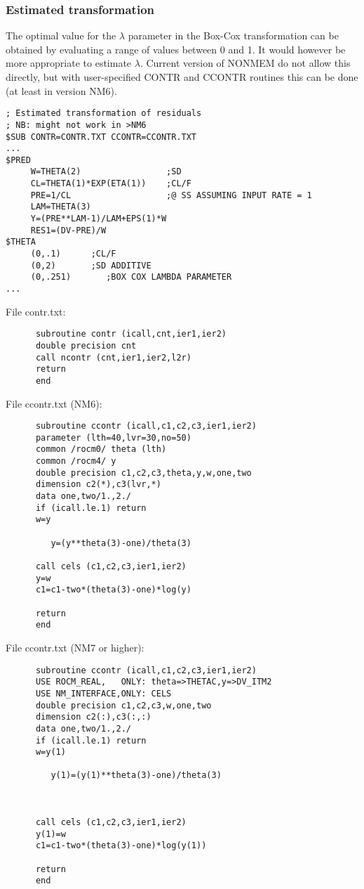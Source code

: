 \documentclass[a4paper,11pt]{article}
\begin{document}
\subsubsection*{Estimated transformation}
The optimal value for the $\lambda$ parameter in the Box-Cox
transformation can be obtained by evaluating a range of values between
0 and 1. It would however be more appropriate to estimate
$\lambda$. Current version of NONMEM do not allow this directly, but
with user-specified CONTR and CCONTR routines this can be done (at
least in version NM6).

\begin{lstlisting}
; Estimated transformation of residuals
; NB: might not work in >NM6
$SUB CONTR=CONTR.TXT CCONTR=CCONTR.TXT
...
$PRED
     W=THETA(2)                 ;SD
     CL=THETA(1)*EXP(ETA(1))    ;CL/F
     PRE=1/CL                   ;@ SS ASSUMING INPUT RATE = 1
     LAM=THETA(3)
     Y=(PRE**LAM-1)/LAM+EPS(1)*W
     RES1=(DV-PRE)/W
$THETA
     (0,.1)      ;CL/F
     (0,2)       ;SD ADDITIVE
     (0,.251)       ;BOX COX LAMBDA PARAMETER
...
\end{lstlisting}

File contr.txt:

\begin{lstlisting}
      subroutine contr (icall,cnt,ier1,ier2)
      double precision cnt
      call ncontr (cnt,ier1,ier2,l2r)
      return
      end
\end{lstlisting}

File ccontr.txt (NM6):

\begin{lstlisting}
      subroutine ccontr (icall,c1,c2,c3,ier1,ier2)
      parameter (lth=40,lvr=30,no=50)
      common /rocm0/ theta (lth)
      common /rocm4/ y
      double precision c1,c2,c3,theta,y,w,one,two
      dimension c2(*),c3(lvr,*)
      data one,two/1.,2./
      if (icall.le.1) return
      w=y

         y=(y**theta(3)-one)/theta(3)

      call cels (c1,c2,c3,ier1,ier2)
      y=w
      c1=c1-two*(theta(3)-one)*log(y)

      return
      end
\end{lstlisting}

File ccontr.txt (NM7 or higher):
\begin{lstlisting}
      subroutine ccontr (icall,c1,c2,c3,ier1,ier2)
      USE ROCM_REAL,   ONLY: theta=>THETAC,y=>DV_ITM2
      USE NM_INTERFACE,ONLY: CELS
      double precision c1,c2,c3,w,one,two
      dimension c2(:),c3(:,:)
      data one,two/1.,2./
      if (icall.le.1) return
      w=y(1)

         y(1)=(y(1)**theta(3)-one)/theta(3)



      call cels (c1,c2,c3,ier1,ier2)
      y(1)=w
      c1=c1-two*(theta(3)-one)*log(y(1))

      return
      end
\end{lstlisting}
\end{document}
